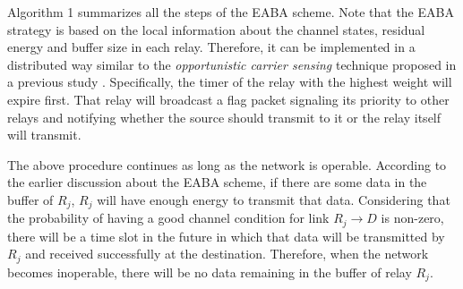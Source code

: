 \documentclass[conference]{IEEEtran}
\begin{document}
Algorithm 1 summarizes all the steps of the EABA scheme. Note that the EABA strategy is based on the local information about the channel states, residual energy and buffer size in each relay. Therefore, it can be implemented in a distributed way similar to the \emph{opportunistic carrier sensing} technique proposed in a previous study \cite{4244758}. Specifically, the timer of the relay with the highest weight will expire first. That relay will broadcast a flag packet signaling its priority to other relays and notifying whether the source should transmit to it or the relay itself will transmit.

The above procedure continues as long as the network is operable. According to the earlier discussion about the EABA scheme, if there are some data in the buffer of $R_j$, $R_j$ will have enough energy to transmit that data. Considering that the probability of having a good channel condition for link $R_j \rightarrow D$ is non-zero, there will be a time slot in the future in which that data will be transmitted by $R_j$ and received successfully at the destination. Therefore, when the network becomes inoperable, there will be no data remaining in the buffer of relay $R_j$.
\end{document}
